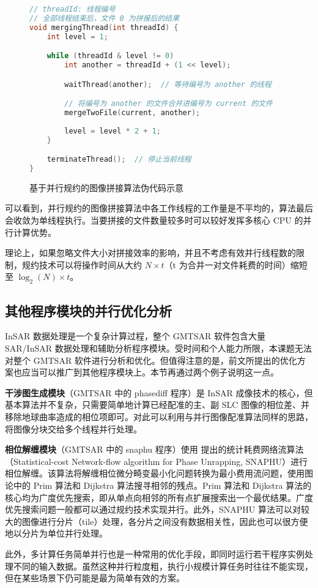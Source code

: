 \begin{figure}[htbp]
\begin{lstlisting}[language=C]
// threadId: 线程编号
// 全部线程结束后，文件 0 为拼接后的结果
void mergingThread(int threadId) {
    int level = 1;

    while (threadId & level != 0)
        int another = threadId + (1 << level);

        waitThread(another);  // 等待编号为 another 的线程

        // 将编号为 another 的文件合并进编号为 current 的文件
        mergeTwoFile(current, another);
        
        level = level * 2 + 1;
    }

    terminateThread();  // 停止当前线程
}
\end{lstlisting}
\caption{基于并行规约的图像拼接算法伪代码示意}
\label{fig:reduce-algo}
\end{figure}

可以看到，并行规约的图像拼接算法中各工作线程的工作量是不平均的，算法最后会收敛为单线程执行。当要拼接的文件数量较多时可以较好发挥多核心 CPU 的并行计算优势。

理论上，如果忽略文件大小对拼接效率的影响，并且不考虑有效并行线程数的限制，规约技术可以将操作时间从大约 $N \times t$（t 为合并一对文件耗费的时间）缩短至 $\log_2(N) \times t$。

\subsection{其他程序模块的并行优化分析}

InSAR 数据处理是一个复杂计算过程，整个 GMTSAR 软件包含大量 SAR/InSAR 数据处理和辅助分析程序模块。受时间和个人能力所限，本课题无法对整个 GMTSAR 软件进行分析和优化。但值得注意的是，前文所提出的优化方案也应当可以推广到其他程序模块上。本节再通过两个例子说明这一点。

\textbf{干涉图生成模块}（GMTSAR 中的 phasediff 程序）是 InSAR 成像技术的核心，但基本算法并不复杂，只需要简单地计算已经配准的主、副 SLC 图像的相位差、并移除地球曲率造成的相位项即可。对此可以利用与并行图像配准算法同样的思路，将图像分块交给多个线程并行处理。

\textbf{相位解缠模块}（GMTSAR 中的 snaphu 程序）使用 \citet{chen2002phase} 提出的统计耗费网络流算法（Statistical-cost Network-flow algorithm for Phase Unrapping, SNAPHU）进行相位解缠。该算法将解缠相位微分畸变最小化问题转换为最小费用流问题，使用图论中的 Prim 算法和 Dijkstra 算法搜寻相邻的残点\cite{cheng2007insar}。Prim 算法和 Dijkstra 算法的核心均为广度优先搜索，即从单点向相邻的所有点扩展搜索出一个最优结果。广度优先搜索问题一般都可以通过规约技术实现并行。此外，SNAPHU 算法可以对较大的图像进行分片（tile）处理，各分片之间没有数据相关性，因此也可以很方便地以分片为单位并行处理。

此外，多计算任务简单并行也是一种常用的优化手段，即同时运行若干程序实例处理不同的输入数据。虽然这种并行粒度粗，执行小规模计算任务时往往不能实现，但在某些场景下仍可能是最为简单有效的方案。
